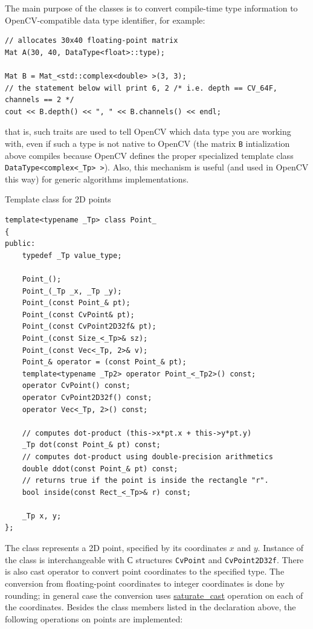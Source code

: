 The main purpose of the classes is to convert compile-time type information to OpenCV-compatible data type identifier, for example:

\begin{lstlisting}
// allocates 30x40 floating-point matrix
Mat A(30, 40, DataType<float>::type);

Mat B = Mat_<std::complex<double> >(3, 3);
// the statement below will print 6, 2 /* i.e. depth == CV_64F, channels == 2 */ 
cout << B.depth() << ", " << B.channels() << endl; 
\end{lstlisting}

that is, such traits are used to tell OpenCV which data type you are working with, even if such a type is not native to OpenCV (the matrix \texttt{B} intialization above compiles because OpenCV defines the proper specialized template class \texttt{DataType<complex<\_Tp> >}). Also, this mechanism is useful (and used in OpenCV this way) for generic algorithms implementations.

Template class for 2D points

\begin{lstlisting}
template<typename _Tp> class Point_
{
public:
    typedef _Tp value_type;
    
    Point_();
    Point_(_Tp _x, _Tp _y);
    Point_(const Point_& pt);
    Point_(const CvPoint& pt);
    Point_(const CvPoint2D32f& pt);
    Point_(const Size_<_Tp>& sz);
    Point_(const Vec<_Tp, 2>& v);
    Point_& operator = (const Point_& pt);
    template<typename _Tp2> operator Point_<_Tp2>() const;
    operator CvPoint() const;
    operator CvPoint2D32f() const;
    operator Vec<_Tp, 2>() const;

    // computes dot-product (this->x*pt.x + this->y*pt.y)
    _Tp dot(const Point_& pt) const;
    // computes dot-product using double-precision arithmetics
    double ddot(const Point_& pt) const;
    // returns true if the point is inside the rectangle "r".
    bool inside(const Rect_<_Tp>& r) const;
    
    _Tp x, y;
};
\end{lstlisting}

The class represents a 2D point, specified by its coordinates $x$ and $y$.
Instance of the class is interchangeable with С structures \texttt{CvPoint} and \texttt{CvPoint2D32f}. There is also cast operator to convert point coordinates to the specified type. The conversion from floating-point coordinates to integer coordinates is done by rounding; in general case the conversion uses \hyperref[saturatecast]{saturate\_cast} operation on each of the coordinates. Besides the class members listed in the declaration above, the following operations on points are implemented:


